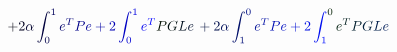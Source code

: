 \documentclass[12pt]{article}
\begin{document}
\makeatletter
\renewcommand*{\@textcolor}[3]{%
  \protect\leavevmode
  \begingroup
    \color#1{#2}#3%
  \endgroup
}
\makeatother
\begin{displaymath}
\mathcolor[RGB]{0,0,15}{+} \mathcolor[RGB]{0,0,30}{2} \mathcolor[RGB]{0,0,45}{\alpha} \mathcolor[RGB]{0,0,60}{\int} _ { \mathcolor[RGB]{0,0,75}{0} } ^ { \mathcolor[RGB]{0,0,90}{1} } \mathcolor[RGB]{0,0,105}{e} ^ { \mathcolor[RGB]{0,0,120}{T} } \mathcolor[RGB]{0,0,135}{P} \mathcolor[RGB]{0,0,150}{e} \mathcolor[RGB]{0,0,165}{+} \mathcolor[RGB]{0,0,180}{2} \mathcolor[RGB]{0,0,195}{\int} _ { \mathcolor[RGB]{0,0,210}{0} } ^ { \mathcolor[RGB]{0,0,225}{1} } \mathcolor[RGB]{0,0,240}{e} ^ { \mathcolor[RGB]{0,0,255}{T} } \mathcolor[RGB]{0,15,0}{P} \mathcolor[RGB]{0,15,15}{G} \mathcolor[RGB]{0,15,30}{L} \mathcolor[RGB]{0,15,45}{e} \mathcolor[RGB]{0,15,60}{\,

+} \mathcolor[RGB]{0,15,75}{2} \mathcolor[RGB]{0,15,90}{\alpha} \mathcolor[RGB]{0,15,105}{\int} _ { \mathcolor[RGB]{0,15,120}{1} } ^ { \mathcolor[RGB]{0,15,135}{0} } \mathcolor[RGB]{0,15,150}{e} ^ { \mathcolor[RGB]{0,15,165}{T} } \mathcolor[RGB]{0,15,180}{P} \mathcolor[RGB]{0,15,195}{e} \mathcolor[RGB]{0,15,210}{+} \mathcolor[RGB]{0,15,225}{2} \mathcolor[RGB]{0,15,240}{\int} _ { \mathcolor[RGB]{0,15,255}{1} } ^ { \mathcolor[RGB]{0,30,0}{0} } \mathcolor[RGB]{0,30,15}{e} ^ { \mathcolor[RGB]{0,30,30}{T} } \mathcolor[RGB]{0,30,45}{P} \mathcolor[RGB]{0,30,60}{G} \mathcolor[RGB]{0,30,75}{L} \mathcolor[RGB]{0,30,90}{e} \,
\end{displaymath}
\end{document}
